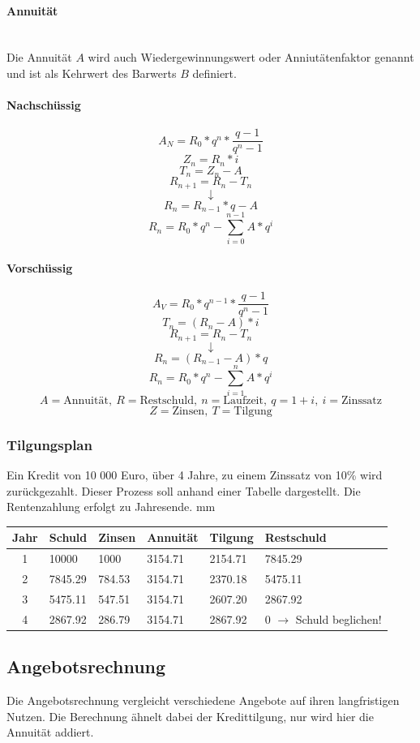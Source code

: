 \documentclass{school}
\begin{document}
\paragraph{Annuität}~\\
Die Annuität $A$ wird auch Wiedergewinnungswert oder Anniutätenfaktor genannt und ist als Kehrwert des Barwerts $B$ definiert.

\paragraph{Nachschüssig}
$$A_N=R_0 * q^n * \frac{q-1}{q^n-1}$$
\vspace{0.5 em}
$$Z_n=R_n * i$$
$$T_n=Z_n - A$$
$$R_{n+1} = R_n - T_n$$
$$\downarrow$$
$$R_{n} = R_{n-1} * q - A$$
$$R_n = R_0 * q^n - \sum^{n-1}_{i = 0}{A * q^i}$$
\paragraph{Vorschüssig}
$$A_V=R_0 * q^{n-1} * \frac{q-1}{q^n-1}$$
\vspace{0.5 em}
$$T_n=(R_n - A) * i$$
$$R_{n+1} = R_n - T_n$$
$$\downarrow$$
$$R_{n} = (R_{n-1} - A) * q$$
$$R_n = R_0 * q^n - \sum^{n}_{i = 1}{A * q^i}$$
\vspace{0.5 em}
$$A = \text{Annuität},~ R = \text{Restschuld},~ n = \text{Laufzeit},~ q = 1 + i,~ i = \text{Zinssatz}$$
$$Z = \text{Zinsen},~ T = \text{Tilgung}$$

\subsubsection{Tilgungsplan}
Ein Kredit von 10 000 Euro, \"uber 4 Jahre, zu einem Zinssatz von 10\% wird zur\"uckgezahlt. Dieser Prozess soll anhand einer Tabelle dargestellt. Die Rentenzahlung erfolgt zu Jahresende.
 mm
\begin{tabular}{c l l l l l}
\textbf{Jahr} & \textbf{Schuld} & \textbf{Zinsen} & \textbf{Annuität} & \textbf{Tilgung} & \textbf{Restschuld}\\
\hline
1 & 10000 & 1000 & 3154.71 & 2154.71 & 7845.29\\
2 & 7845.29 & 784.53 & 3154.71 & 2370.18 & 5475.11\\
3 & 5475.11 & 547.51 & 3154.71 & 2607.20 & 2867.92\\
4 & 2867.92 & 286.79 & 3154.71 & 2867.92 & 0 $\rightarrow$ Schuld beglichen!
\end{tabular}

\subsection{Angebotsrechnung}
Die Angebotsrechnung vergleicht verschiedene Angebote auf ihren langfristigen Nutzen.
Die Berechnung ähnelt dabei der Kredittilgung, nur wird hier die Annuität addiert.
\end{document}
